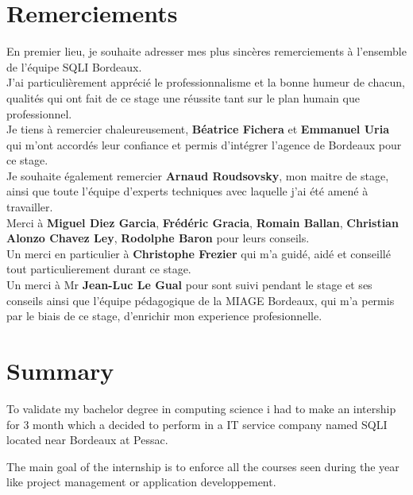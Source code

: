\documentclass{report}
\newcommand{\jumpOne}{\\[1\baselineskip]}
\begin{document}
\setlength{\parindent}{0cm}

\chapter{Remerciements}
En premier lieu, je souhaite adresser mes plus sincères remerciements à l'ensemble de l'équipe SQLI Bordeaux. 
\jumpOne
J'ai particulièrement apprécié le professionnalisme et la bonne humeur de chacun, qualités qui ont fait de ce stage une réussite tant sur le plan humain que professionnel. 
\jumpOne
Je tiens à remercier chaleureusement, \textbf{Béatrice Fichera} et \textbf{Emmanuel Uria} qui m'ont accordés leur confiance et permis d'intégrer l'agence de Bordeaux pour ce stage.
\jumpOne
Je souhaite également remercier \textbf{Arnaud Roudsovsky}, mon maitre de stage, ainsi que toute l'équipe d'experts techniques avec laquelle j'ai été amené à travailler.
\jumpOne
Merci à \textbf{Miguel Diez Garcia}, \textbf{Frédéric Gracia}, \textbf{Romain Ballan}, \textbf{Christian Alonzo Chavez Ley}, \textbf{Rodolphe Baron} pour leurs conseils. 
\jumpOne
Un merci en particulier à \textbf{Christophe Frezier} qui m'a guidé, aidé et conseillé tout particulierement durant ce stage. 
\jumpOne
Un merci à Mr \textbf{Jean-Luc Le Gual} pour sont suivi pendant le stage et ses conseils ainsi que l'équipe pédagogique de la MIAGE Bordeaux, qui m'a permis par le biais de ce stage, d'enrichir mon experience profesionnelle.   





\newpage






\tableofcontents{}

\newpage
\chapter{Summary}

To validate my bachelor degree in computing science i had to make an intership for 3 month which a decided to perform in a IT service company named SQLI located near Bordeaux at Pessac.

The main goal of the internship is to enforce all the courses seen during the year like project management or application developpement. 
\end{document}
